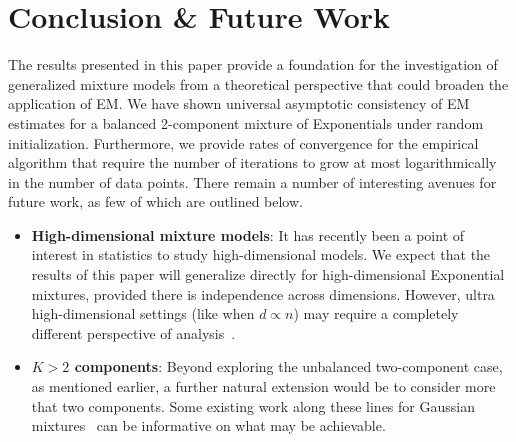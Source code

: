 \documentclass[runningheads]{llncs}
\begin{document}
\section{Conclusion \& Future Work}\label{sec:conclusion}
The results presented in this paper provide a foundation for the investigation
of generalized mixture models from a theoretical perspective that could
broaden the application of EM. We have shown universal asymptotic consistency of
EM estimates for a balanced 2-component mixture of Exponentials under random
initialization. Furthermore, we provide rates of convergence for the empirical
algorithm that require the number of iterations to grow at most logarithmically
in the number of data points. There remain a number of interesting avenues for
future work, as few of which are outlined below.
\begin{itemize}
\item \textbf{High-dimensional mixture models}: It has recently been a point of
  interest in statistics to study high-dimensional models. We expect that
  the results of this paper will generalize directly for high-dimensional
  Exponential mixtures, provided there is independence across dimensions.
  However, ultra high-dimensional settings (like when $d \propto n$) may require
  a completely different perspective of analysis~\cite{candes2020phase}.

\item \textbf{$K>2$ components}: Beyond exploring the unbalanced two-component
  case, as mentioned earlier, a further natural extension would be to
  consider more that two components. Some existing work along these lines for
  Gaussian mixtures~\cite{jin2016local} can be informative on what may be achievable.


\end{itemize}
\end{document}
